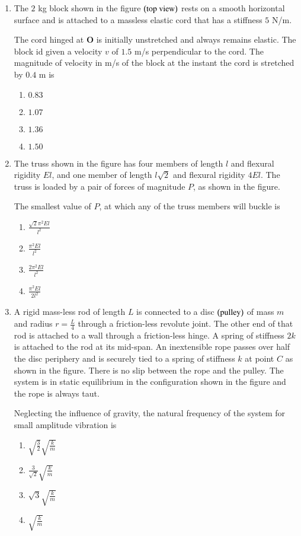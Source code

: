 \documentclass[journal,12pt,onecolumn]{IEEEtran}
\theoremstyle{remark}
\begin{document}
\begin{enumerate}[start=27]
\item The $2$ kg block shown in the figure $\left(\text{top view}\right)$ rests on a smooth horizontal surface and is attached to a massless elastic cord that has a stiffness $5$ N/m.
\begin{center}

\end{center}
The cord hinged at \textbf{O} is initially unstretched and always remains elastic. The block id given a velocity $v$ of $1.5$ m/s perpendicular to the cord. The magnitude of velocity in m/s of the block at the instant the cord is stretched by $0.4$ m is
\hfill{}
\begin{enumerate}
\item $0.83$
\item $1.07$
\item $1.36$
\item $1.50$
\end{enumerate}


\item The truss shown in the figure has four members of length $l$ and flexural rigidity $El$, and one member of length $l\sqrt{2}$ and flexural rigidity $4El$. The truss is loaded by a pair of forces of magnitude $P$, as shown in the figure.
\begin{center}

\end{center}
The smallest value of $P$, at which any of the truss members will buckle is
\hfill{}
\begin{enumerate}
\item $\frac{\sqrt{2}\pi^2El}{l^2}$
\item $\frac{\pi^2El}{l^2}$
\item $\frac{2\pi^2El}{l^2}$
\item $\frac{\pi^2El}{2l^2}$
\end{enumerate}

\item A rigid mass-less rod of length $L$ is connected to a disc $\left(\text{pulley}\right)$ of mass $m$ and radius $r = \frac{L}{4}$ through a friction-less revolute joint. The other end of that rod is attached to a wall through a friction-less hinge. A spring of stiffness $2k$ is attached to the rod at its mid-span. An inextensible rope passes over half the disc periphery and is securely tied to a spring of stiffness $k$ at point $C$ as shown in the figure. There is no slip between the rope and the pulley. The system is in static equilibrium in the configuration shown in the figure and the rope is always taut.
\begin{center}

\end{center}
Neglecting the influence of gravity, the natural frequency of the system for small amplitude vibration is
\hfill{}
\begin{enumerate}
\item $\sqrt{\frac{3}{2}}\sqrt{\frac{k}{m}}$ 
\item $\frac{3}{\sqrt{2}}\sqrt{\frac{k}{m}}$ 
\item $\sqrt{3}\sqrt{\frac{k}{m}}$ 
\item $\sqrt{\frac{k}{m}}$ 
\end{enumerate}


\end{enumerate}
\end{document}
